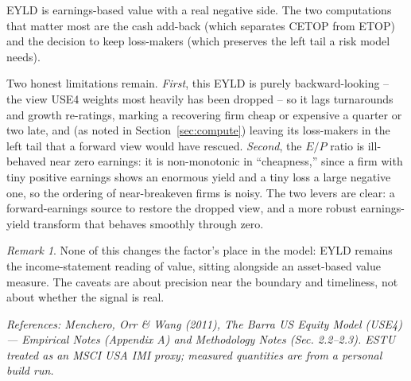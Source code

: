 \documentclass[11pt]{article}
\theoremstyle{definition}
\theoremstyle{plain}
\theoremstyle{remark}
\newtheorem*{remark}{Remark}
\begin{document}
\begin{keyresult}
EYLD is earnings-based value with a real negative side. The two computations that matter most are the cash add-back (which separates CETOP from ETOP) and the decision to keep loss-makers (which preserves the left tail a risk model needs).
\end{keyresult}

\begin{pitfall}
Two honest limitations remain. \emph{First}, this EYLD is purely backward-looking -- the view USE4 weights most heavily has been dropped -- so it lags turnarounds and growth re-ratings, marking a recovering firm cheap or expensive a quarter or two late, and (as noted in Section~\ref{sec:compute}) leaving its loss-makers in the left tail that a forward view would have rescued. \emph{Second}, the $E/P$ ratio is ill-behaved near zero earnings: it is non-monotonic in ``cheapness,'' since a firm with tiny positive earnings shows an enormous yield and a tiny loss a large negative one, so the ordering of near-breakeven firms is noisy. The two levers are clear: a forward-earnings source to restore the dropped view, and a more robust earnings-yield transform that behaves smoothly through zero.
\end{pitfall}

\begin{remark}
None of this changes the factor's place in the model: EYLD remains the income-statement reading of value, sitting alongside an asset-based value measure. The caveats are about precision near the boundary and timeliness, not about whether the signal is real.
\end{remark}

\begin{center}\small\itshape
References: Menchero, Orr \& Wang (2011), \textit{The Barra US Equity Model (USE4)} --- Empirical Notes (Appendix A) and Methodology Notes (Sec. 2.2--2.3). ESTU treated as an MSCI USA IMI proxy; measured quantities are from a personal build run.
\end{center}
\end{document}
